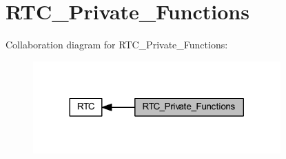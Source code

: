 \hypertarget{group___r_t_c___private___functions}{}\section{R\+T\+C\+\_\+\+Private\+\_\+\+Functions}
\label{group___r_t_c___private___functions}
Collaboration diagram for R\+T\+C\+\_\+\+Private\+\_\+\+Functions\+:
\nopagebreak
\begin{figure}[H]
\begin{center}
\leavevmode
\includegraphics[width=269pt]{group___r_t_c___private___functions}
\end{center}
\end{figure}
